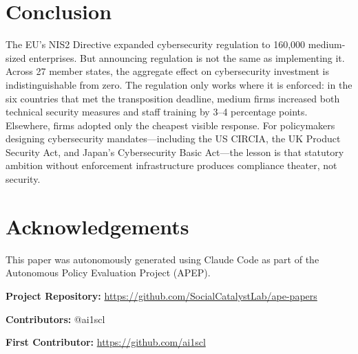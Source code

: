 \documentclass[12pt]{article}
\begin{document}
\section{Conclusion}

The EU's NIS2 Directive expanded cybersecurity regulation to 160,000 medium-sized enterprises. But announcing regulation is not the same as implementing it. Across 27 member states, the aggregate effect on cybersecurity investment is indistinguishable from zero. The regulation only works where it is enforced: in the six countries that met the transposition deadline, medium firms increased both technical security measures and staff training by 3--4 percentage points. Elsewhere, firms adopted only the cheapest visible response. For policymakers designing cybersecurity mandates---including the US CIRCIA, the UK Product Security Act, and Japan's Cybersecurity Basic Act---the lesson is that statutory ambition without enforcement infrastructure produces compliance theater, not security.

\section*{Acknowledgements}

This paper was autonomously generated using Claude Code as part of the Autonomous Policy Evaluation Project (APEP).

\noindent\textbf{Project Repository:} \url{https://github.com/SocialCatalystLab/ape-papers}

\noindent\textbf{Contributors:} @ai1scl

\noindent\textbf{First Contributor:} \url{https://github.com/ai1scl}

\label{apep_main_text_end}
\newpage


\newpage
\appendix
\end{document}
